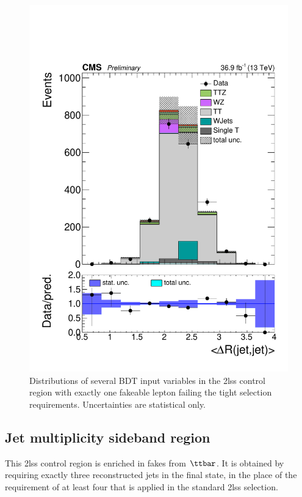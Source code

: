 \begin{figure}[!htb]
\includegraphics[width=0.30\linewidth]{plots_controlregions/2lss_appl_1fo_data/kinMVA_input_avg_dr_jet.pdf}
\caption{Distributions of several BDT input variables in the 2lss control region with exactly one fakeable lepton failing the tight selection requirements.
Uncertainties are statistical only.
}
\label{fig:cr_2lss_appl_1fo_3}
\end{figure}





\clearpage

\subsection{Jet multiplicity sideband region}

This 2lss control region is enriched in fakes from $\ttbar$. It is obtained by requiring exactly three reconstructed jets in the final state,
in the place of the requirement of at least four that is applied in the standard 2lss selection.

